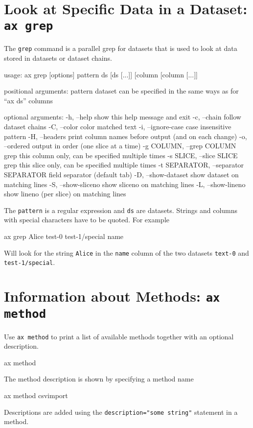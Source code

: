 \section{Look at Specific Data in a Dataset: \texttt{ax grep}}
The \texttt{grep} command is a parallel grep for datasets that is
used to look at data stored in datasets or dataset chains.
\begin{shell}
  usage: ax grep [options] pattern ds [ds [...]] [column [column [...]]

    positional arguments:
    pattern
    dataset                   can be specified in the same ways as for ``ax ds''
    columns

    optional arguments:
    -h, --help                show this help message and exit
    -c, --chain               follow dataset chains
    -C, --color               color matched text
    -i, --ignore-case         case insensitive pattern
    -H, --headers             print column names before output (and on each change)
    -o, --ordered             output in order (one slice at a time)
    -g COLUMN, --grep COLUMN  grep this column only, can be specified multiple times
    -s SLICE, --slice SLICE   grep this slice only, can be specified multiple times
    -t SEPARATOR, --separator SEPARATOR   field separator (default tab)
    -D, --show-dataset        show dataset on matching lines
    -S, --show-sliceno        show sliceno on matching lines
    -L, --show-lineno         show lineno (per slice) on matching lines
\end{shell}
\noindent The \texttt{pattern} is a regular expression and \texttt{ds} are
datasets.  Strings and columns with special characters have to be quoted.
For example
\begin{shell}
ax grep Alice test-0 test-1/special name
\end{shell}
Will look for the string \texttt{Alice} in the \texttt{name} column of
the two datasets \texttt{text-0} and \texttt{test-1/special}.


\section{Information about Methods: \texttt{ax method}}
Use \texttt{ax method} to print a list of available methods together
with an optional description.
\begin{shell}
ax method
\end{shell}
The method description is shown by specifying a method name
\begin{shell}
ax method csvimport
\end{shell}
Descriptions are added using the \texttt{description="some string"}
statement in a method.


